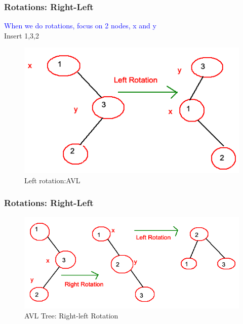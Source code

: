 \documentclass[11pt]{beamer}
\begin{document}
 \begin{frame}
	\frametitle{Rotations: Right-Left}
   \textcolor{blue}{When we do rotations, focus on 2 nodes, x and y}\\
   \alert{Insert 1,3,2}
  	\begin{figure}
  		\centering
  		\includegraphics[width=0.9\linewidth]{"Screenshot 2020-11-24 at 11.40.09 AM"}
  		\caption{Left rotation:AVL}
  		\label{fig:screenshot-2020-11-24-at-11}
  	\end{figure} 	
\end{frame}	

 \begin{frame}
	\frametitle{Rotations: Right-Left}
    \begin{figure}
    	\centering
    	\includegraphics[width=1\linewidth]{"Screenshot 2020-11-24 at 11.47.36 AM"}
    	\caption{AVL Tree: Right-left Rotation}
    	\label{fig:screenshot-2020-11-24-at-11}
    \end{figure}   	
\end{frame}	
\end{document}

